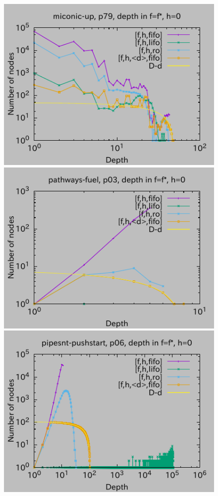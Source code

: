 \begin{figure}[htbp]
\includegraphics{img/depth/miconic-up/p79.pdf}
\includegraphics{img/depth/pathways-fuel/p03.pdf}
\includegraphics{img/depth/pipesnt-pushstart/p06.pdf}

\end{figure}
